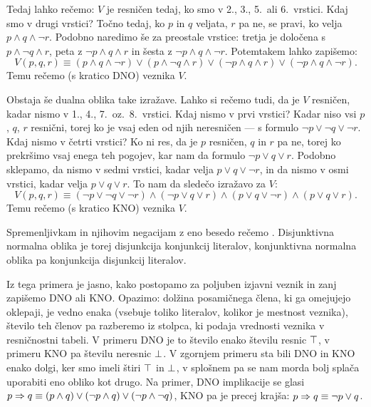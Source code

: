 		Tedaj lahko rečemo: $V$ je resničen tedaj, ko smo v 2., 3., 5.~ali 6.~vrstici. Kdaj smo v drugi vrstici? Točno tedaj, ko $p$ in $q$ veljata, $r$ pa ne, se pravi, ko velja $p \land q \land \lnot{r}$. Podobno naredimo še za preostale vrstice: tretja je določena s $p \land \lnot{q} \land r$, peta z $\lnot{p} \land q \land r$ in šesta z $\lnot{p} \land q \land \lnot{r}$. Potemtakem lahko zapišemo:
		\[V(p, q, r) \equiv (p \land q \land \lnot{r}) \lor (p \land \lnot{q} \land r) \lor (\lnot{p} \land q \land r) \lor (\lnot{p} \land q \land \lnot{r}).\]
		Temu rečemo  (s kratico DNO) veznika $V$.
		
		Obstaja še dualna oblika take izražave. Lahko si rečemo tudi, da je $V$ resničen, kadar nismo v 1., 4., 7.~oz.~8.~vrstici. Kdaj nismo v prvi vrstici? Kadar niso vsi $p$, $q$, $r$ resnični, torej ko je vsaj eden od njih neresničen --- s formulo $\lnot{p} \lor \lnot{q} \lor \lnot{r}$. Kdaj nismo v četrti vrstici? Ko ni res, da je $p$ resničen, $q$ in $r$ pa ne, torej ko prekršimo vsaj enega teh pogojev, kar nam da formulo $\lnot{p} \lor q \lor r$. Podobno sklepamo, da nismo v sedmi vrstici, kadar velja $p \lor q \lor \lnot{r}$, in da nismo v osmi vrstici, kadar velja $p \lor q \lor r$. To nam da sledečo izražavo za $V$:
		\[V(p, q, r) \equiv (\lnot{p} \lor \lnot{q} \lor \lnot{r}) \land (\lnot{p} \lor q \lor r) \land (p \lor q \lor \lnot{r}) \land (p \lor q \lor r).\]
		Temu rečemo  (s kratico KNO) veznika $V$.
		
		Spremenljivkam in njihovim negacijam z eno besedo rečemo . Disjunktivna normalna oblika je torej disjunkcija konjunkcij literalov, konjunktivna normalna oblika pa konjunkcija disjunkcij literalov.
		
		Iz tega primera je jasno, kako postopamo za poljuben izjavni veznik in zanj zapišemo DNO ali KNO. Opazimo: dolžina posamičnega člena, ki ga omejujejo oklepaji, je vedno enaka (vsebuje toliko literalov, kolikor je mestnost veznika), število teh členov pa razberemo iz stolpca, ki podaja vrednosti veznika v resničnostni tabeli. V primeru DNO je to število enako številu resnic $\top$, v primeru KNO pa številu neresnic $\bot$. V zgornjem primeru sta bili DNO in KNO enako dolgi, ker smo imeli štiri $\top$ in $\bot$, v splošnem pa se nam morda bolj splača uporabiti eno obliko kot drugo. Na primer, DNO implikacije se glasi $p \Rightarrow q \equiv (p \land q) \lor (\lnot{p} \land q) \lor (\lnot{p} \land \lnot{q})$, KNO pa je precej krajša: $p \Rightarrow q \equiv \lnot{p} \lor q$.
		

